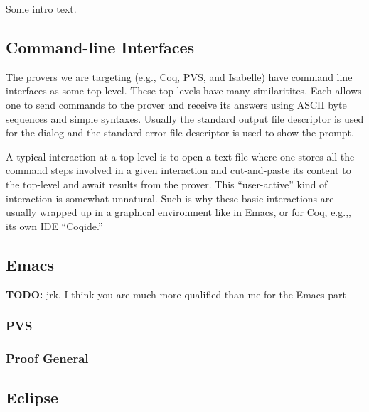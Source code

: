\documentclass{llncs}
\newcommand{\todo}{\textbf{TODO: }}
\newcommand{\eg}{e.g.,\xspace}
\begin{document}
Some intro text. %

\subsection{Command-line Interfaces}
\label{subsec:comm-line-interf}

The provers we are targeting (\eg Coq, PVS, and Isabelle) have command
line interfaces as some top-level.  These top-levels have many
similaritites.  Each allows one to send commands to the prover and
receive its answers using ASCII byte sequences and simple syntaxes.
Usually the standard output file descriptor is used for the dialog and
the standard error file descriptor is used to show the prompt.

A typical interaction at a top-level is to open a text file where one
stores all the command steps involved in a given interaction and
cut-and-paste its content to the top-level and await results from the
prover.  This ``user-active'' kind of interaction is somewhat
unnatural.  Such is why these basic interactions are usually wrapped
up in a graphical environment like in Emacs, or for Coq, \eg, its own
IDE ``Coqide.''

\subsection{Emacs}
\label{subsec:emacs}

\todo{jrk, I think you are much more qualified than me for the Emacs
  part} %

\subsubsection{PVS}


\subsubsection{Proof General}

\subsection{Eclipse}
\label{subsec:eclipse}
\end{document}
